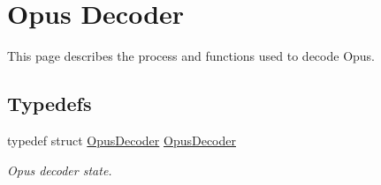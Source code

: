 \hypertarget{group__opus__decoder}{}\section{Opus Decoder}
\label{group__opus__decoder}


This page describes the process and functions used to decode Opus.  


\subsection*{Typedefs}
\begin{DoxyCompactItemize}
\item 
typedef struct \hyperlink{group__opus__decoder_ga401d8579958d36094715a6b90cd159a6}{Opus\+Decoder} \hyperlink{group__opus__decoder_ga401d8579958d36094715a6b90cd159a6}{Opus\+Decoder}
\begin{DoxyCompactList}\small\item\em Opus decoder state. \end{DoxyCompactList}\end{DoxyCompactItemize}
